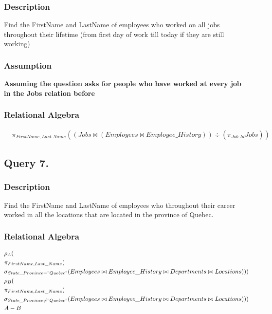 \documentclass[a4paper]{article}
\begin{document}
\subsubsection{Description}
Find the FirstName and LastName of employees who worked on all jobs
throughout their lifetime (from first day of work till today if they are still
working)
\subsubsection{Assumption}
\textbf{Assuming the question asks for people who have worked at every job in the Jobs relation before}
\subsubsection{Relational Algebra}
\begin{align*}
    &\pi_{FirstName, Last\_Name} ((Jobs \bowtie (Employees \bowtie Employee\_History) ) \div (\pi_{Job\_Id} Jobs))
\end{align*}

\subsection{Query 7.}
\subsubsection{Description}
Find the FirstName and LastName of employees who throughout their career
worked in all the locations that are located in the province of Quebec.
\subsubsection{Relational Algebra}
\begin{align*}
    & \rho_{A} ( \\
    &\pi_{FirstName, Last\_Name} ( \\
    &\sigma_{State\_Province = "Quebec"} (Employees \bowtie Employee\_History \bowtie Departments \bowtie Locations))) \\
    & \rho_{B} ( \\
    &\pi_{FirstName, Last\_Name} ( \\
    &\sigma_{State\_Province \neq "Quebec"} (Employees \bowtie Employee\_History \bowtie Departments \bowtie Locations))) \\
    & A - B
\end{align*}
\end{document}
